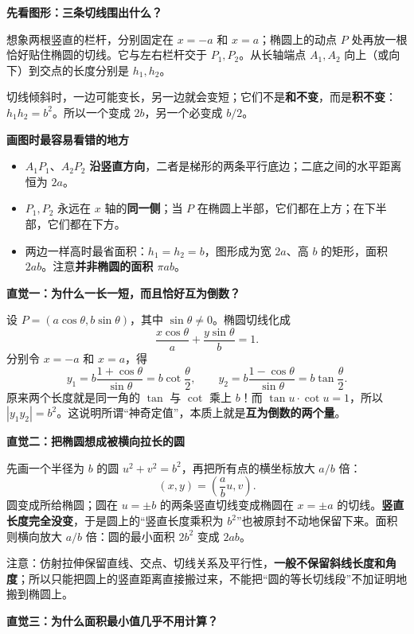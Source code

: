 \begin{explanationbox}
\textbf{\textcolor{CExplanation}{先看图形：三条切线围出什么？}}

想象两根竖直的栏杆，分别固定在 $x=-a$ 和 $x=a$；椭圆上的动点 $P$ 处再放一根恰好贴住椭圆的切线。它与左右栏杆交于 $P_1,P_2$。从长轴端点 $A_1,A_2$ 向上（或向下）到交点的长度分别是 $h_1,h_2$。

切线倾斜时，一边可能变长，另一边就会变短；它们不是\textbf{和不变}，而是\textbf{积不变}：$h_1h_2=b^2$。所以一个变成 $2b$，另一个必变成 $b/2$。

\medskip
\textbf{\textcolor{CExplanation}{画图时最容易看错的地方}}
\begin{itemize}[leftmargin=*,itemsep=0.4em,topsep=0.3em]
\item $A_1P_1$、$A_2P_2$ \textbf{沿竖直方向}，二者是梯形的两条平行底边；二底之间的水平距离恒为 $2a$。
\item $P_1,P_2$ 永远在 $x$ 轴的\textbf{同一侧}；当 $P$ 在椭圆上半部，它们都在上方；在下半部，它们都在下方。
\item 两边一样高时最省面积：$h_1=h_2=b$，图形成为宽 $2a$、高 $b$ 的矩形，面积 $2ab$。注意\textbf{并非椭圆的面积 $\pi ab$}。
\end{itemize}

\medskip
\textbf{\textcolor{CExplanation}{直觉一：为什么一长一短，而且恰好互为倒数？}}

设 $P=(a\cos\theta,b\sin\theta)$，其中 $\sin\theta\ne0$。椭圆切线化成
\[
\frac{x\cos\theta}{a}+\frac{y\sin\theta}{b}=1.
\]
分别令 $x=-a$ 和 $x=a$，得
\[
y_1=b\frac{1+\cos\theta}{\sin\theta}
=b\cot\frac{\theta}{2},\qquad
y_2=b\frac{1-\cos\theta}{\sin\theta}
=b\tan\frac{\theta}{2}.
\]
原来两个长度就是同一角的 $\tan$ 与 $\cot$ 乘上 $b$！而 $\tan u\cdot\cot u=1$，所以 $|y_1y_2|=b^2$。这说明所谓“神奇定值”，本质上就是\textbf{互为倒数的两个量}。

\medskip
\textbf{\textcolor{CExplanation}{直觉二：把椭圆想成被横向拉长的圆}}

先画一个半径为 $b$ 的圆 $u^2+v^2=b^2$，再把所有点的横坐标放大 $a/b$ 倍：
\[
(x,y)=\left(\frac ab u,v\right).
\]
圆变成所给椭圆；圆在 $u=\pm b$ 的两条竖直切线变成椭圆在 $x=\pm a$ 的切线。\textbf{竖直长度完全没变}，于是圆上的“竖直长度乘积为 $b^2$”也被原封不动地保留下来。面积则横向放大 $a/b$ 倍：圆的最小面积 $2b^2$ 变成 $2ab$。

注意：仿射拉伸保留直线、交点、切线关系及平行性，\textbf{一般不保留斜线长度和角度}；所以只能把圆上的竖直距离直接搬过来，不能把“圆的等长切线段”不加证明地搬到椭圆上。

\medskip
\textbf{\textcolor{CExplanation}{直觉三：为什么面积最小值几乎不用计算？}}


\end{explanationbox}
